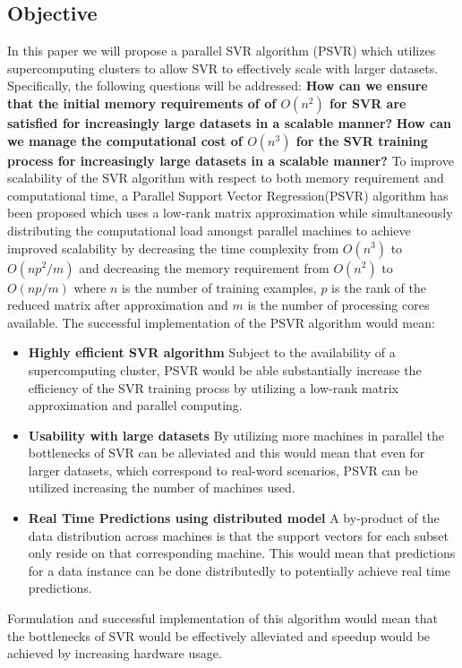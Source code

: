 \documentclass[12pt]{article}
\begin{document}
\subsection{Objective}
In this paper we will propose a parallel SVR algorithm (PSVR) which utilizes supercomputing clusters to allow SVR to effectively scale with larger datasets.
Specifically, the following questions will be addressed:
\newline\newline
\setlength{\leftskip}{3cm}
{\bf How can we ensure that the initial memory requirements of of $O(n^2)$ for SVR are satisfied for increasingly large datasets in a scalable manner?}
\newline\newline
{\bf How can we manage the computational cost of $O(n^3)$ for the SVR training process for increasingly large datasets in a scalable manner?}
\setlength{\leftskip}{0pt}
\newline\newline
To improve scalability of the SVR algorithm with respect to both memory requirement and computational time, a Parallel Support Vector Regression(PSVR) algorithm has been proposed which uses a low-rank matrix approximation while simultaneously distributing the computational load amongst parallel machines to achieve improved scalability by decreasing the time complexity from $O(n^3)$ to $O(np^2/m)$ and decreasing the memory requirement from $O(n^2)$ to $O(np/m)$ where $n$ is the number of training examples, $p$ is the rank of the reduced matrix after approximation and $m$ is the number of processing cores available.
\newline\newline
The successful implementation of the PSVR algorithm would mean:
\begin{itemize}
\item {\bf Highly efficient SVR algorithm} 
Subject to the availability of a supercomputing cluster, PSVR would be able substantially increase the efficiency of the SVR training procss by utilizing a low-rank matrix approximation and parallel computing.
\item {\bf Usability with large datasets} By utilizing more machines in parallel the bottlenecks of SVR can be alleviated and this would mean that even for larger datasets, which correspond to real-word scenarios, PSVR can be utilized increasing the number of machines used.
\item {\bf Real Time Predictions using distributed model} A by-product of the data distribution across machines is that the support vectors for each subset only reside on that corresponding machine. This would mean that predictions for a data instance can be done distributedly to potentially achieve real time predictions.
\end{itemize}
Formulation and successful implementation of this algorithm would mean that the bottlenecks of SVR would be effectively alleviated and speedup would be achieved by increasing hardware usage.
\end{document}
